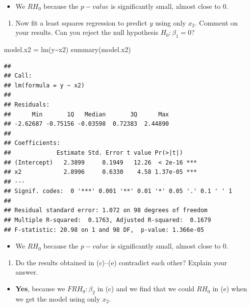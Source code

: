 \documentclass[
]{article}
\newenvironment{Shaded}{\begin{snugshade}}{\end{snugshade}}
\newcommand{\FunctionTok}[1]{\textcolor[rgb]{0.00,0.00,0.00}{#1}}
\newcommand{\NormalTok}[1]{#1}
\newcommand{\OtherTok}[1]{\textcolor[rgb]{0.56,0.35,0.01}{#1}}
\newcommand{\SpecialCharTok}[1]{\textcolor[rgb]{0.00,0.00,0.00}{#1}}
\providecommand{\tightlist}{%
  \setlength{\itemsep}{0pt}\setlength{\parskip}{0pt}}
\begin{document}
\begin{itemize}
\tightlist
\item
  We \(RH_0\) because the \(p-value\) is significantly small, almost
  close to \(0\).
\end{itemize}

\begin{enumerate}
\def\labelenumi{(\alph{enumi})}
\setcounter{enumi}{4}
\tightlist
\item
  Now fit a least squares regression to predict \(y\) using only
  \(x_2\). Comment on your results. Can you reject the null hypothesis
  \(H_0 : \beta_1 = 0\)?
\end{enumerate}

\begin{Shaded}
\begin{Highlighting}[]
\NormalTok{model.x2 }\OtherTok{=} \FunctionTok{lm}\NormalTok{(y}\SpecialCharTok{\textasciitilde{}}\NormalTok{x2)}
\FunctionTok{summary}\NormalTok{(model.x2)}
\end{Highlighting}
\end{Shaded}

\begin{verbatim}
## 
## Call:
## lm(formula = y ~ x2)
## 
## Residuals:
##      Min       1Q   Median       3Q      Max 
## -2.62687 -0.75156 -0.03598  0.72383  2.44890 
## 
## Coefficients:
##             Estimate Std. Error t value Pr(>|t|)    
## (Intercept)   2.3899     0.1949   12.26  < 2e-16 ***
## x2            2.8996     0.6330    4.58 1.37e-05 ***
## ---
## Signif. codes:  0 '***' 0.001 '**' 0.01 '*' 0.05 '.' 0.1 ' ' 1
## 
## Residual standard error: 1.072 on 98 degrees of freedom
## Multiple R-squared:  0.1763, Adjusted R-squared:  0.1679 
## F-statistic: 20.98 on 1 and 98 DF,  p-value: 1.366e-05
\end{verbatim}

\begin{itemize}
\tightlist
\item
  We \(RH_0\) because the \(p-value\) is significantly small, almost
  close to \(0\).
\end{itemize}

\begin{enumerate}
\def\labelenumi{(\alph{enumi})}
\setcounter{enumi}{5}
\tightlist
\item
  Do the results obtained in (c)--(e) contradict each other? Explain
  your answer.
\end{enumerate}

\begin{itemize}
\tightlist
\item
  \textbf{Yes}, because we \(FRH_0: \beta_2\) in (c) and we find that we
  could \(RH_0\) in (e) when we get the model using only \(x_2\).
\end{itemize}
\end{document}
